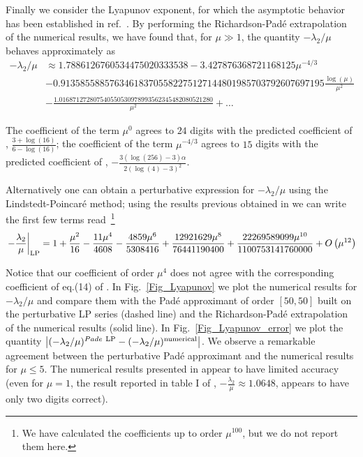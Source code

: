 \documentclass[final]{article}
\begin{document}
Finally we consider the Lyapunov exponent, for which the asymptotic behavior has been established in ref.~\cite{Grasman05}.
By performing the Richardson-Pad\'e extrapolation of the numerical results, we have found that, for $\mu \gg 1$, the 
quantity $-\lambda_2/\mu$ behaves approximately as
\begin{equation}
\begin{split}
- \lambda_2/\mu &\approx  1.7886126760534475020333538 - 3.427876368721168125 \mu^{-4/3} \\
&- 0.913585588576346183705582275127144801985703792607697195  \frac{\log (\mu)}{\mu ^2} \\
&- \frac{1.016871272807540550530978993562345482080521280}{\mu^2}  + \dots
\end{split}
\end{equation}

The coefficient of the term $\mu^0$ agrees to $24$ digits with the predicted coefficient of \cite{Grasman05}, $\frac{3+\log (16)}{6-\log (16)}$; the coefficient of the term $\mu^{-4/3}$ agrees to $15$ digits with the predicted coefficient of \cite{Grasman05},
$-\frac{3 (\log (256)-3) \alpha}{2 (\log (4)-3)^2}$. 

Alternatively one can obtain a perturbative expression for $-\lambda_2/\mu$ using the Lindstedt-Poincar\'e method; 
using the results previous obtained in \cite{Amore18} we can write  the first few terms read~\footnote{We have calculated the coefficients up to order $\mu^{100}$, but we do not report them here.}
\begin{equation}
\left. -\frac{\lambda_2}{\mu}\right|_{\rm LP} = 1+\frac{\mu^2}{16}-\frac{11 \mu^4}{4608}-\frac{4859 \mu^6}{5308416}+\frac{12921629 \mu^8}{76441190400}+\frac{22269589099\mu ^{10}}{1100753141760000} + O\left(\mu^{12}\right)
\label{eq_Lyapunov_LP}
\end{equation}

Notice that our coefficient of order $\mu^4$ does not agree with the corresponding coefficient of eq.(14) of \cite{Grasman05}.
In Fig.~\ref{Fig_Lyapunov} we plot the numerical results for $-\lambda_2/\mu$ and compare them with the Pad\'e approximant of order $[50,50]$ built on the perturbative LP series (dashed line)
and the Richardson-Pad\'e extrapolation of the numerical results (solid line).
In Fig.~\ref{Fig_Lyapunov_error} we plot the quantity $\left|(-\lambda_2/\mu)^{Pade \ {\rm LP}}- (-\lambda_2/\mu)^{{\rm numerical}}\right|$. We observe a remarkable agreement between the perturbative Pad\'e approximant and the numerical results for $\mu \leq 5$. The numerical results presented in \cite{Grasman05} appear to have limited accuracy (even for $\mu=1$, the result reported in table I of \cite{Grasman05}, $-\frac{\lambda_2}{\mu} \approx 1.0648$, appears to have only two digits correct).
\end{document}
